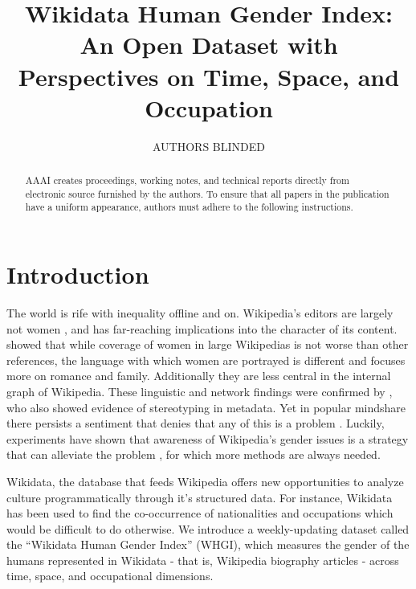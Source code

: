 \documentclass[letterpaper]{article}
\begin{document}
%
\title{Wikidata Human Gender Index: An Open Dataset with Perspectives on Time, Space, and Occupation}

\author{AUTHORS BLINDED}
    
\maketitle
\begin{abstract}
AAAI creates proceedings, working notes, and technical reports directly from electronic source furnished by the authors. To ensure that all papers in the publication have a uniform appearance, authors must adhere to the following instructions. 
\end{abstract}


\section{Introduction}
The world is rife with inequality offline and on. Wikipedia's editors are largely not women \cite{hill_wikipedia_2013}, and has far-reaching implications into the character of its content. \cite{wagner_its_2015} showed that while coverage of women in large Wikipedias is not worse than other references, the language with which women are portrayed is different and focuses more on romance and family. Additionally they are less central in the internal graph of Wikipedia. These linguistic and network findings were confirmed by \cite{graells-garrido_first_2015}, who also showed evidence of stereotyping in metadata. Yet in popular mindshare there persists a sentiment that denies that any of this is a problem \cite{eckert_retriggering_2013}. Luckily, experiments have shown that awareness of Wikipedia's gender issues is a strategy that can alleviate the problem \cite{hinnosaar_gender_2015}, for which more methods are always needed.

Wikidata, the database that feeds Wikipedia \cite{vrandecic_wikidata:_2014} offers new opportunities to analyze culture programmatically through it's structured data. For instance, Wikidata has been used to find the co-occurrence of nationalities and occupations \cite{goldfarb_quantifying_2015} which would be difficult to do otherwise. We introduce a weekly-updating dataset called the ``Wikidata Human Gender Index'' (WHGI), which measures the gender of the humans represented in Wikidata - that is, Wikipedia biography articles - across time, space, and occupational dimensions. 
\end{document}
